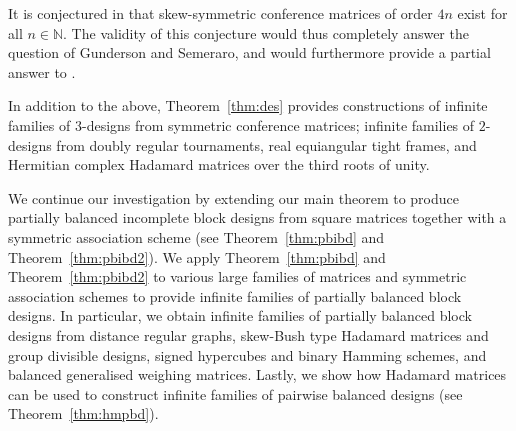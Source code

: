\documentclass[11pt]{article}
\makeatletter
\newcommand*{\transpose}{%
  {\mathpalette\@transpose{}}%
}
\newcommand*{\@transpose}[2]{%
  \raisebox{\depth}{$\m@th#1\intercal$}%
}
\makeatother
\begin{document}
It is conjectured in \cite{S78} that skew-symmetric conference matrices of order $4n$ exist for all $n \in \mathbb N$.
The validity of this conjecture would thus completely answer the question of Gunderson and Semeraro, and would furthermore provide a partial answer to \cite[Problem~1]{FF}.

In addition to the above, Theorem~\ref{thm:des} provides constructions of infinite families of  $3$-designs from symmetric conference matrices; infinite families of $2$-designs from doubly regular tournaments, real equiangular tight frames, and Hermitian complex Hadamard matrices over the third roots of unity.

We continue our investigation by extending our main theorem to produce partially balanced incomplete block designs from square matrices together with a symmetric association scheme (see Theorem~\ref{thm:pbibd} and Theorem~\ref{thm:pbibd2}).
We apply Theorem~\ref{thm:pbibd} and Theorem~\ref{thm:pbibd2} to various large families of matrices and symmetric association schemes to provide infinite families of partially balanced block designs.
In particular, we obtain infinite families of partially balanced block designs from distance regular graphs, skew-Bush type Hadamard matrices and group divisible designs, signed hypercubes and binary Hamming schemes, and balanced generalised weighing matrices. 
Lastly, we show how Hadamard matrices can be used to construct infinite families of pairwise balanced designs (see Theorem~\ref{thm:hmpbd}).

\end{document}
